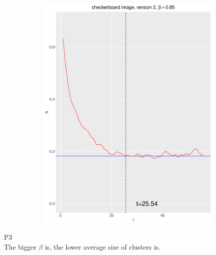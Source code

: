 \documentclass[12pt, oneside]{article}   	%
\begin{document}
\begin{figure}[H]
\begin{subfigure}[b]{0.475\textwidth}
            \includegraphics[width=\textwidth, height=0.32\textheight]{check_v2_85.pdf}
        \end{subfigure}
\end{figure}
\vspace{1cm}
P3\\
The bigger $\beta$ is, the lower average size of clusters is.
\end{document}
